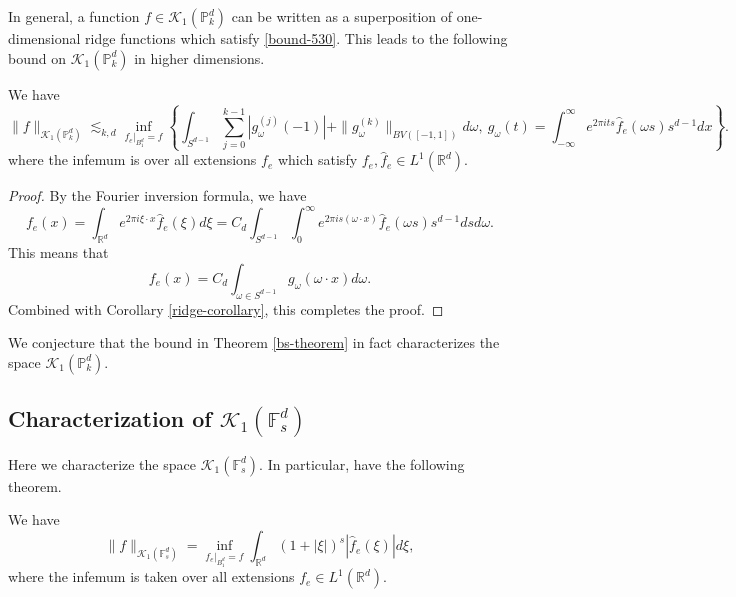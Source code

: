 In general, a function $f\in \mathcal{K}_1(\mathbb{P}^d_k)$ can be written as a superposition of one-dimensional ridge functions which satisfy \eqref{bound-530}. This leads to the following bound on $\mathcal{K}_1(\mathbb{P}^d_k)$ in higher dimensions.
\begin{theorem}\label{bs-theorem}
 We have
 \begin{equation}\label{bs-label}
 \|f\|_{\mathcal{K}_1(\mathbb{P}^d_k)} \lesssim_{k,d} \inf_{f_e|_{B_1^d} = f}\left\{\int_{S^{d-1}}\sum_{j=0}^{k-1} |g_\omega^{(j)}(-1)| + \|g_\omega^{(k)}\|_{BV([-1,1])} d\omega,~g_\omega(t) = \int_{-\infty}^\infty e^{2\pi i ts}\hat{f}_e(\omega s)s^{d-1}dx\right\}.
\end{equation}
where the infemum is over all extensions $f_e$ which satisfy $f_e, \hat{f}_e\in L^1(\mathbb{R}^d)$.
\end{theorem}
\begin{proof}
 By the Fourier inversion formula, we have
 \begin{equation}
  f_e(x) = \int_{\mathbb{R}^d} e^{2\pi i \xi\cdot x}\hat{f}_e(\xi)d\xi = C_d\int_{S^{d-1}}\int_{0}^\infty e^{2\pi i s(\omega\cdot x)}\hat{f}_e(\omega s) s^{d-1}ds d\omega.
 \end{equation}
 This means that
 \begin{equation}
  f_e(x) = C_d\int_{\omega\in S^{d-1}} g_\omega(\omega\cdot x)d\omega.
 \end{equation}
 Combined with Corollary \ref{ridge-corollary}, this completes the proof.

\end{proof}
We conjecture that the bound in Theorem \ref{bs-theorem} in fact characterizes the space $\mathcal{K}_1(\mathbb{P}^d_k)$.

\subsection{Characterization of $\mathcal{K}_1(\mathbb{F}^d_s)$}
Here we characterize the space $\mathcal{K}_1(\mathbb{F}^d_s)$. In particular, have the following theorem.
\begin{theorem}\label{spectral-barron-theorem}
We have
\begin{equation}\label{fourier-integral-condition}
 \|f\|_{\mathcal{K}_1(\mathbb{F}^d_s)} = \inf_{f_e|_{B_1^d} = f} \int_{\mathbb{R}^d} (1+|\xi|)^s|\hat{f}_e(\xi)|d\xi,
\end{equation}
where the infemum is taken over all extensions $f_e\in L^1(\mathbb{R}^d)$.
\end{theorem}

